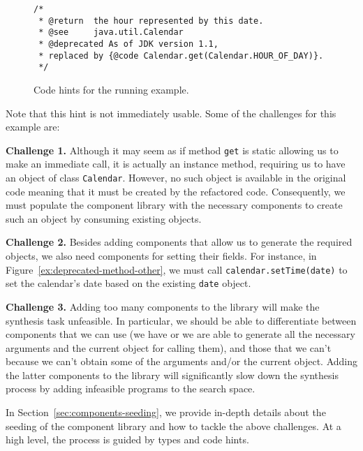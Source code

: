 \documentclass[sigconf,review,anonymous]{acmart}
\begin{document}
\begin{figure}
\begin{lstlisting}[mathescape=true,showstringspaces=false]
/*
 * @return  the hour represented by this date.
 * @see     java.util.Calendar
 * @deprecated As of JDK version 1.1,
 * replaced by {@code Calendar.get(Calendar.HOUR_OF_DAY)}.
 */  
\end{lstlisting}
\caption{Code hints for the running example.}
\label{ex:code-hints}
\end{figure}


Note that this hint is not immediately usable. Some of the challenges
for this example are:

{\bf Challenge 1.}  Although it may seem as if
method \texttt{get} is static allowing us to make an immediate call,
it is actually an instance method, requiring us to have an object of
class \texttt{Calendar}. However, no such object is available in the
original code meaning that it must be created by the refactored code.
Consequently, we must populate the component library with the necessary
components to create such an object by consuming existing objects.

{\bf Challenge 2.} Besides adding components that allow
us to generate the required objects, we also need
components for setting their fields. For instance,
in Figure~\ref{ex:deprecated-method-other}, we must call
\texttt{calendar.setTime(date)} to set the calendar's date
based on the existing \texttt{date} object.

{\bf Challenge 3.} Adding too many components to the library will
make the synthesis task unfeasible. In particular, we should
be able to differentiate between components that we can use
(we have or we are able to generate
all the necessary arguments and the current object for calling them), and those
that we can't because we can't obtain some of the arguments
and/or the current object. Adding the latter components to the library will
significantly slow down the synthesis process by
adding infeasible programs to the search space.


In Section~\ref{sec:components-seeding}, we provide in-depth details about the
seeding of the component library and how to tackle the above challenges. 
At a high level, the process is guided by types and code hints.
\end{document}
